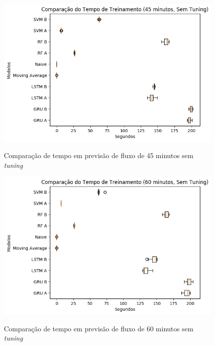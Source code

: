 \begin{figure}[htbp]
    \centering
    \includegraphics[scale=0.8]{monography/img/snapshots/comparacao_do_tempo_de_treinamento_(45_minutos,_sem_tuning)_performance_boxes.png}
    \label{figure:comparacao_previsao_tempo_45_sem_tuning}
    \caption{Comparação de tempo em previsão de fluxo de 45 minutos sem \textit{tuning}}
\end{figure}

\begin{figure}[htbp]
    \centering
    \includegraphics[scale=0.8]{monography/img/snapshots/comparacao_do_tempo_de_treinamento_(60_minutos,_sem_tuning)_performance_boxes.png}
    \label{figure:comparacao_previsao_tempo_60_sem_tuning}
    \caption{Comparação de tempo em previsão de fluxo de 60 minutos sem \textit{tuning}}
\end{figure}

